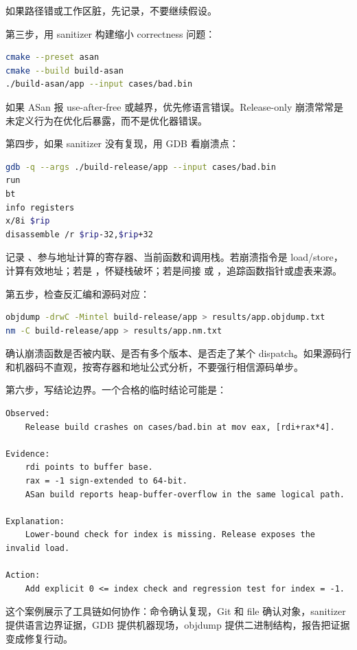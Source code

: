 如果路径错或工作区脏，先记录，不要继续假设。

第三步，用 sanitizer 构建缩小 correctness 问题：

\begin{lstlisting}[language=bash]
cmake --preset asan
cmake --build build-asan
./build-asan/app --input cases/bad.bin
\end{lstlisting}

如果 ASan 报 use-after-free 或越界，优先修语言错误。Release-only 崩溃常常是未定义行为在优化后暴露，而不是优化器错误。

第四步，如果 sanitizer 没有复现，用 GDB 看崩溃点：

\begin{lstlisting}[language=bash]
gdb -q --args ./build-release/app --input cases/bad.bin
run
bt
info registers
x/8i $rip
disassemble /r $rip-32,$rip+32
\end{lstlisting}

记录 、参与地址计算的寄存器、当前函数和调用栈。若崩溃指令是 load/store，计算有效地址；若是 ，怀疑栈破坏；若是间接  或 ，追踪函数指针或虚表来源。

第五步，检查反汇编和源码对应：

\begin{lstlisting}[language=bash]
objdump -drwC -Mintel build-release/app > results/app.objdump.txt
nm -C build-release/app > results/app.nm.txt
\end{lstlisting}

确认崩溃函数是否被内联、是否有多个版本、是否走了某个 dispatch。如果源码行和机器码不直观，按寄存器和地址公式分析，不要强行相信源码单步。

第六步，写结论边界。一个合格的临时结论可能是：

\begin{lstlisting}
Observed:
    Release build crashes on cases/bad.bin at mov eax, [rdi+rax*4].

Evidence:
    rdi points to buffer base.
    rax = -1 sign-extended to 64-bit.
    ASan build reports heap-buffer-overflow in the same logical path.

Explanation:
    Lower-bound check for index is missing. Release exposes the invalid load.

Action:
    Add explicit 0 <= index check and regression test for index = -1.
\end{lstlisting}

这个案例展示了工具链如何协作：命令确认复现，Git 和 file 确认对象，sanitizer 提供语言边界证据，GDB 提供机器现场，objdump 提供二进制结构，报告把证据变成修复行动。


